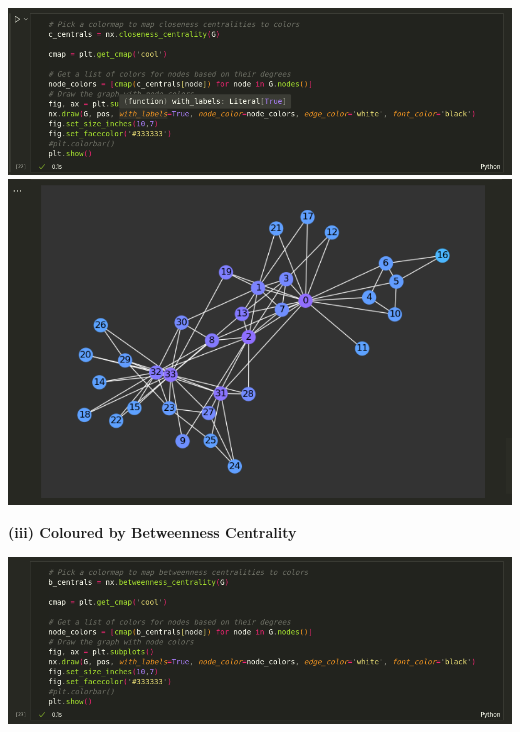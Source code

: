 \documentclass{article}
\begin{document}
\begin{enumerate}[label=(\alph*), left=10pt, itemsep=10pt]
\begin{minipage}[t]{0.9\textwidth}
\begin{minipage}[t]{0.9\textwidth}
                    \centering
                    \includegraphics[width=5.9in]{./5hii1.png}
                    \includegraphics[width=5.9in]{./5hii2.png}
                \end{minipage}
        \end{minipage}
        \newpage
        \begin{minipage}[t]{0.9\textwidth}
                \textbf{(iii) Coloured by Betweenness Centrality}\\
                \begin{minipage}[t]{0.9\textwidth}
                    \vspace{0.1em} %
                    \centering
                    \includegraphics[width=5.9in]{./5hiii1.png}

\end{minipage}
\end{minipage}
\end{enumerate}
\end{document}
